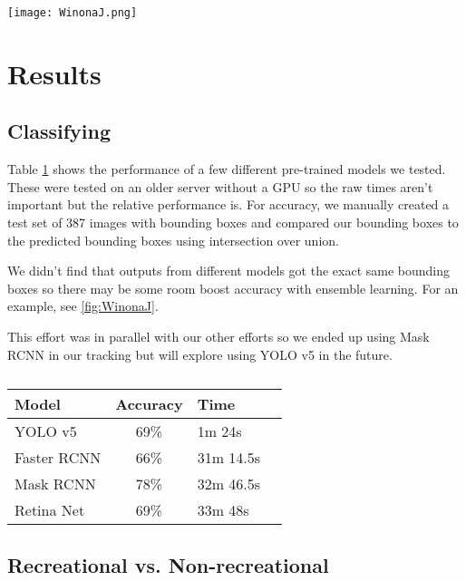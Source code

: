 \documentclass[10pt,twocolumn,letterpaper]{article}
\begin{document}
\begin{figure*}[t]
  \centering
    \texttt{[image: WinonaJ.png]}
    \caption{Red box is the value from the test data.}
    \label{fig:WinonaJ}
  \hfill
\end{figure*}
\section{Results} 

\subsection{Classifying}

Table \ref{tab:ModelPerf} shows the performance of a few different pre-trained models we tested. These were tested on an older server without a GPU so the raw times aren't important but the relative performance is. For accuracy, we manually created a test set of 387 images with bounding boxes and compared our bounding boxes to the predicted bounding boxes using intersection over union.

We didn't find that outputs from different models got the exact same bounding boxes so there may be some room boost accuracy with ensemble learning. For an example, see \ref{fig:WinonaJ}.

This effort was in parallel with our other efforts so we ended up using Mask RCNN in our tracking but will explore using YOLO v5 in the future.

\begin{table}[t]
  \centering
  \begin{tabular}{@{}lc@{}lc@{}}
    \toprule
    Model & Accuracy\nobreakspace\nobreakspace\nobreakspace & \nobreakspace\nobreakspace Time \\
    \midrule
    YOLO v5\cite{pytorch_yolov5} & 69\% & 1m 24s \\
    Faster RCNN\cite{pytorch_fasterrcnn_resnet50_fpn} & 66\% & 31m 14.5s \\
    Mask RCNN\cite{pytorch_maskrcnn_resnet50_fpn} & 78\% & 32m 46.5s\\
    Retina Net\cite{pytorch_retinanet_resnet50_fpn} & 69\% & 33m 48s\\
    \bottomrule
  \end{tabular}
  \caption{}
  \label{tab:ModelPerf}
\end{table}


\subsection{Recreational vs. Non-recreational}
\end{document}
